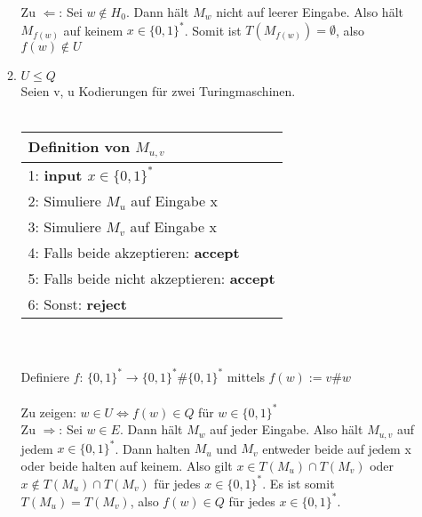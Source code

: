 \documentclass[12pt]{scrartcl}
\begin{document}
\begin{enumerate}
\begin{enumerate}
              Zu $\Leftarrow$: Sei $w \notin H_0$. Dann hält $M_{w}$ nicht auf leerer Eingabe. Also hält $M_{f(w)}$ auf keinem $x \in \{0,1\}^*$.
              Somit ist $T(M_{f(w)}) = \emptyset$, also $f(w) \notin U$\\
\newpage
        \item $U \leq Q$\\
              Seien v, u Kodierungen für zwei Turingmaschinen.\\\\
              \begin{tabular}[h!]{l}
                \hline
                Definition von $M_{u, v}$\\\hline
                1: \textbf{input $x \in \{0,1\}^*$}\\
                2: Simuliere $M_u$ auf Eingabe x\\
                3: Simuliere $M_v$ auf Eingabe x\\
                4: Falls beide akzeptieren: \textbf{accept}\\
                5: Falls beide nicht akzeptieren: \textbf{accept}\\
                6: Sonst: \textbf{reject}\\\hline
              \end{tabular}\\\\
              Definiere $f: \, \{0,1\}^* \rightarrow \{0,1\}^* \# \{0,1\}^*$ mittels $f(w) := v\#w$\\\\
              Zu zeigen: $w \in U \Longleftrightarrow f(w) \in Q $ für $w \in \{0,1\}^*$\\

              Zu $\Rightarrow$: Sei $w \in E$. Dann hält $M_w$ auf jeder Eingabe. Also hält 
              $M_{u,v}$ auf jedem $x \in \{0,1\}^*$. Dann halten $M_u$ und $M_v$ entweder beide auf jedem x oder beide halten auf keinem.
               Also gilt $x \in T(M_u) \cap T(M_v)$ oder $x \notin T(M_u) \cap T(M_v)$ für jedes $x \in \{0,1\}^*$. Es ist somit
               $ T(M_u) = T(M_v)$, also $f(w) \in Q$ für jedes $x \in \{0,1\}^*$.\\
 

\end{enumerate}
\end{enumerate}
\end{document}
